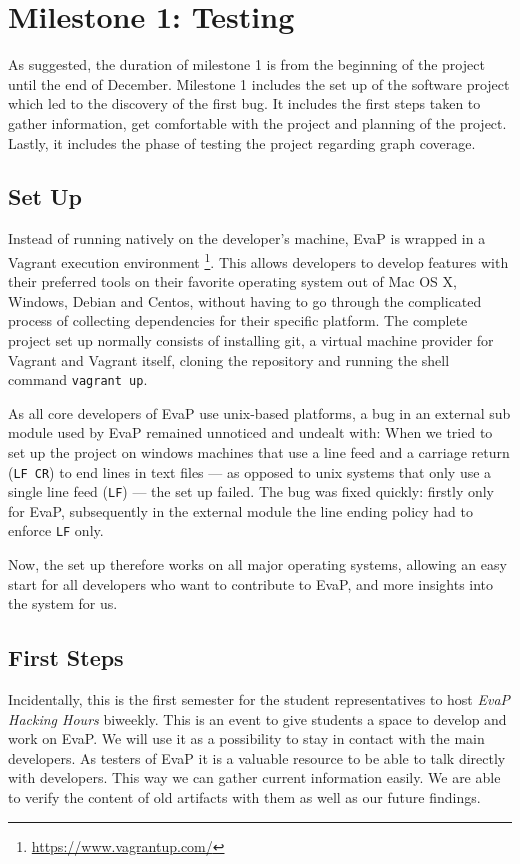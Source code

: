\section{Milestone 1: Testing}
As suggested, the duration of milestone 1 is from the beginning of the project until the end of December.
Milestone 1 includes the set up of the software project which led to the discovery of the first bug.
It includes the first steps taken to gather information, get comfortable with the project and planning of the project.
Lastly, it includes the phase of testing the project regarding graph coverage.

\subsection{Set Up}\label{setup}
Instead of running natively on the developer's machine, EvaP is wrapped in a Vagrant execution environment%
\footnote{\url{https://www.vagrantup.com/}}.
This allows developers to develop features with their preferred tools on their favorite operating system out of Mac OS X, Windows, Debian and Centos, without having to go through the complicated process of collecting dependencies for their specific platform.
The complete project set up normally consists of installing git, a virtual machine provider for Vagrant and Vagrant itself, cloning the repository and running the shell command \texttt{vagrant up}.

As all core developers of EvaP use unix-based platforms, a bug in an external sub module used by EvaP remained unnoticed and undealt with:
When we tried to set up the project on windows machines that use a line feed and a carriage return (\texttt{LF}~\texttt{CR}) to end lines in text files --- as opposed to unix systems that only use a single line feed (\texttt{LF}) --- the set up failed.
The bug was fixed quickly: firstly only for EvaP, subsequently in the external module the line ending policy had to enforce \texttt{LF} only.

Now, the set up therefore works on all major operating systems, allowing an easy start for all developers who want to contribute to EvaP, and more insights into the system for us.

\subsection{First Steps}
Incidentally, this is the first semester for the student representatives to host \emph{EvaP Hacking Hours} biweekly.
This is an event to give students a space to develop and work on EvaP.
We will use it as a possibility to stay in contact with the main developers.
As testers of EvaP it is a valuable resource to be able to talk directly with developers.
This way we can gather current information easily.
We are able to verify the content of old artifacts with them as well as our future findings.

